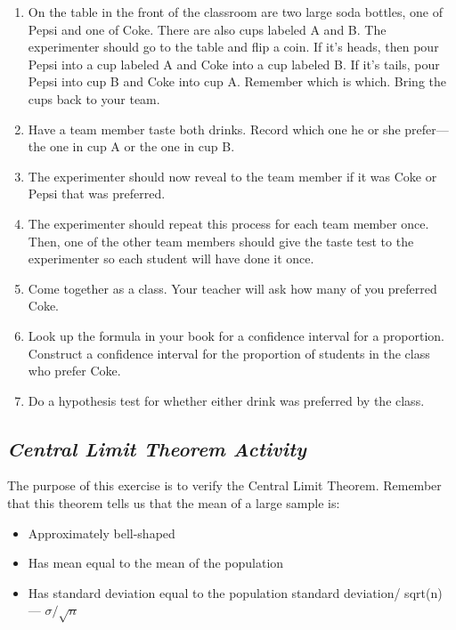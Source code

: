 \documentclass[twoside,openany]{tufte-book}
\begin{document}
 \renewcommand{\labelenumi}{\arabic{enumi}.}
  
\begin{enumerate}[leftmargin=1cm, itemsep=.2em]
\item On the table in the front of the classroom are two large soda bottles, one of Pepsi and one of Coke. There are also cups labeled A and B. The experimenter should go to the table and flip a coin. If it's heads, then pour Pepsi into a cup labeled A and Coke into a cup labeled B. If it's tails, pour Pepsi into cup B and Coke into cup A. Remember which is which. Bring the cups back to your team.
\item Have a team member taste both drinks. Record which one he or she prefer---the one in cup A or the one in cup B.
\item The experimenter should now reveal to the team member if it was Coke or Pepsi that was preferred.
\item The experimenter should repeat this process for each team member once. Then, one of the other team members should give the taste test to the experimenter so each student will have done it once.
\item Come together as a class. Your teacher will ask how many of you preferred Coke. 
\item Look up the formula in your book for a confidence interval for a proportion. Construct a confidence interval for the proportion of students in the class who prefer Coke.
\item Do a hypothesis test for whether either drink was preferred by the class. 
\end{enumerate}



\subsection{\textbf{\textit{Central Limit Theorem Activity}}}
The purpose of this exercise is to verify the Central
 Limit Theorem. Remember that this theorem tells us that the mean of a large sample is:
\begin{itemize}[leftmargin=1cm, itemsep=.2em]
\item Approximately bell-shaped
\item Has mean equal to the mean of the population
\item Has standard deviation equal to the population standard deviation/ sqrt(n) --- $\sigma/\sqrt{n}$
\end{itemize}
\end{document}
